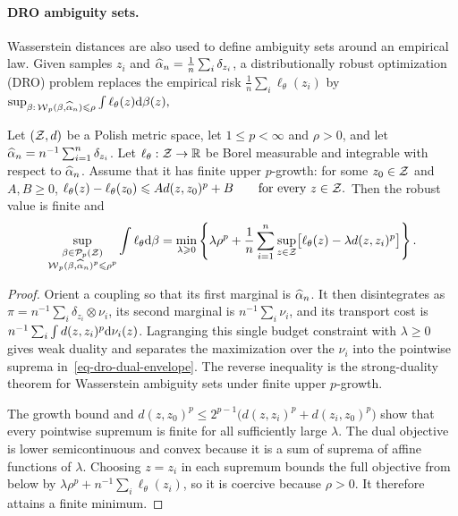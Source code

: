 \paragraph{DRO ambiguity sets.}
Wasserstein distances are also used to define ambiguity sets around an empirical law. Given samples $z_i$ and $\widehat{\alpha}_n=\frac1n\sum_i\delta_{z_i}$, a distributionally robust optimization (DRO) problem replaces the empirical risk $\frac1n\sum_i \ell_\theta(z_i)$ by
\(\sup_{\beta:\,\operatorname{\mathcal{W}}_p(\beta,\widehat{\alpha}_n)\leqslant \rho} \int \ell_\theta(z)\mathrm{d}\beta(z),\)
\begin{prop}\label{prop-empirical-wasserstein-dro-duality}
Let $(\mathcal{Z},d)$ be a Polish metric space, let $1\leq p<\infty$ and $\rho>0$, and let $\widehat{\alpha}_n=n^{-1}\sum_{i=1}^n\delta_{z_i}$. Let $\ell_\theta:\mathcal{Z}\to\mathbb{R}$ be Borel measurable and integrable with respect to $\widehat{\alpha}_n$. Assume that it has finite upper $p$-growth: for some $z_0\in\mathcal{Z}$ and $A,B\geq0$,
\(\ell_\theta(z)-\ell_\theta(z_0) \leqslant A d(z,z_0)^p+B \qquad\text{for every }z\in\mathcal{Z}.\)
Then the robust value is finite and
\begin{equation}\label{eq-dro-dual-envelope}
\sup_{\substack{\beta\in\mathcal{P}_p(\mathcal{Z})\\\operatorname{\mathcal{W}}_p(\beta,\widehat{\alpha}_n)^p\leqslant \rho^p}}
\int \ell_\theta\mathrm{d}\beta
=
\min_{\lambda\geqslant0}
\left\{
\lambda\rho^p
+
\frac1n\sum_{i=1}^n
\sup_{z\in\mathcal{Z}}\bigl[\ell_\theta(z)-\lambda d(z,z_i)^p\bigr]
\right\}.
\end{equation}
\end{prop}
\begin{proof}
Orient a coupling so that its first marginal is $\widehat{\alpha}_n$. It then disintegrates as $\pi=n^{-1}\sum_i\delta_{z_i}\otimes\nu_i$, its second marginal is $n^{-1}\sum_i\nu_i$, and its transport cost is $n^{-1}\sum_i\int d(z,z_i)^p\mathrm{d}\nu_i(z)$. Lagranging this single budget constraint with $\lambda\geq0$ gives weak duality and separates the maximization over the $\nu_i$ into the pointwise suprema in~\eqref{eq-dro-dual-envelope}. The reverse inequality is the strong-duality theorem for Wasserstein ambiguity sets under finite upper $p$-growth.

The growth bound and
$d(z,z_0)^p\leq2^{p-1}\bigl(d(z,z_i)^p+d(z_i,z_0)^p\bigr)$ show that every pointwise supremum is finite for all sufficiently large $\lambda$. The dual objective is lower semicontinuous and convex because it is a sum of suprema of affine functions of $\lambda$. Choosing $z=z_i$ in each supremum bounds the full objective from below by
$\lambda\rho^p+n^{-1}\sum_i\ell_\theta(z_i)$, so it is coercive because $\rho>0$. It therefore attains a finite minimum.
\end{proof}

